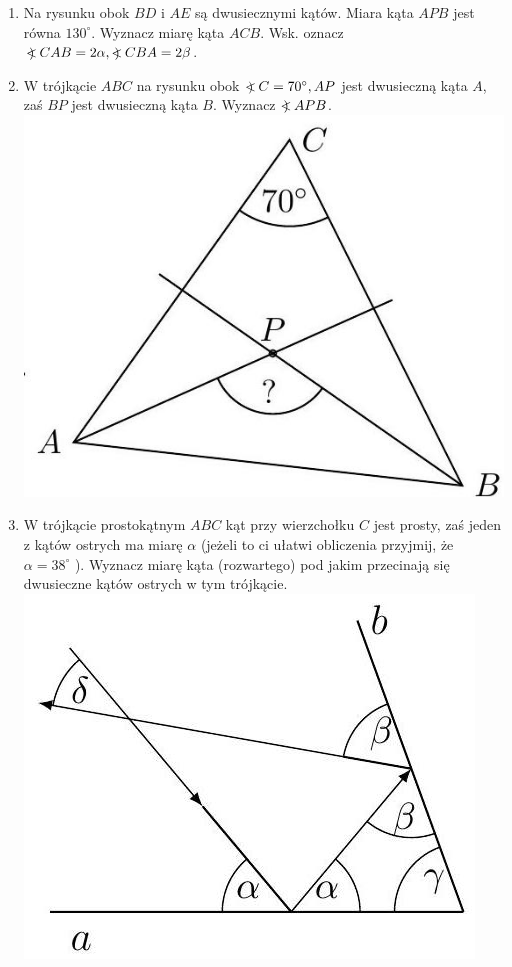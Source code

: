 \documentclass[10pt]{article}
\newcommand\Varangle{\mathop{{<\!\!\!\!\!\text{\small)}}\:}\nolimits}
\begin{document}
\begin{enumerate}
  \item Na rysunku obok \(B D\) i \(A E\) są dwusiecznymi kątów. Miara kąta \(A P B\) jest równa \(130^{\circ}\). Wyznacz miarę kąta \(A C B\). Wsk. oznacz \(\Varangle C A B=2 \alpha, \Varangle C B A=2 \beta\).
  \item W trójkącie \(A B C\) na rysunku obok \(\Varangle C=70^{\circ}, A P\) jest dwusieczną kąta \(A\), zaś \(B P\) jest dwusieczną kąta \(B\). Wyznacz \(\Varangle A P B\).\\
\includegraphics[max width=\textwidth, center]{2024_11_21_71f62bd117d375398909g-019(1)}
  \item W trójkącie prostokątnym \(A B C\) kąt przy wierzchołku \(C\) jest prosty, zaś jeden z kątów ostrych ma miarę \(\alpha\) (jeżeli to ci ułatwi obliczenia przyjmij, że \(\alpha=38^{\circ}\) ). Wyznacz miarę kąta (rozwartego) pod jakim przecinają się dwusieczne kątów ostrych w tym trójkącie.\\
\includegraphics[max width=\textwidth, center]{2024_11_21_71f62bd117d375398909g-019}

\end{enumerate}
\end{document}

